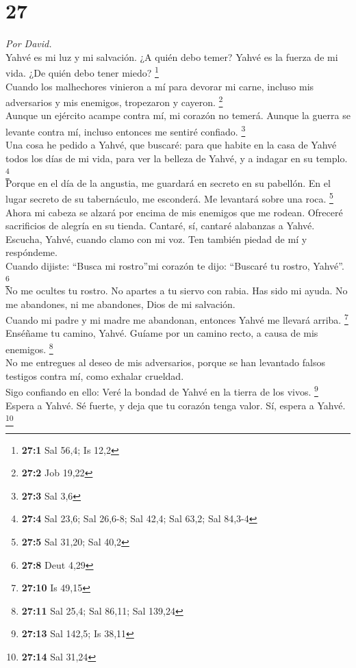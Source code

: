 \hypertarget{section-26}{%
\section{27}\label{section-26}}

\emph{Por David.}\\
 Yahvé es mi luz y mi salvación. ¿A quién debo temer?
Yahvé es la fuerza de mi vida. ¿De quién debo tener miedo? \footnote{\textbf{27:1}
  Sal 56,4; Is 12,2}\\
 Cuando los malhechores vinieron a mí para devorar mi
carne, incluso mis adversarios y mis enemigos, tropezaron y cayeron.
\footnote{\textbf{27:2} Job 19,22}\\
 Aunque un ejército acampe contra mí, mi corazón no
temerá. Aunque la guerra se levante contra mí, incluso entonces me
sentiré confiado. \footnote{\textbf{27:3} Sal 3,6}\\
 Una cosa he pedido a Yahvé, que buscaré: para que habite
en la casa de Yahvé todos los días de mi vida, para ver la belleza de
Yahvé, y a indagar en su templo. \footnote{\textbf{27:4} Sal 23,6; Sal
  26,6-8; Sal 42,4; Sal 63,2; Sal 84,3-4}\\
 Porque en el día de la angustia, me guardará en secreto
en su pabellón. En el lugar secreto de su tabernáculo, me esconderá. Me
levantará sobre una roca. \footnote{\textbf{27:5} Sal 31,20; Sal 40,2}\\
 Ahora mi cabeza se alzará por encima de mis enemigos que
me rodean. Ofreceré sacrificios de alegría en su tienda. Cantaré, sí,
cantaré alabanzas a Yahvé.\\
 Escucha, Yahvé, cuando clamo con mi voz. Ten también
piedad de mí y respóndeme.\\
 Cuando dijiste: ``Busca mi rostro''mi corazón te dijo:
``Buscaré tu rostro, Yahvé''. \footnote{\textbf{27:8} Deut 4,29}\\
 No me ocultes tu rostro. No apartes a tu siervo con
rabia. Has sido mi ayuda. No me abandones, ni me abandones, Dios de mi
salvación.\\
 Cuando mi padre y mi madre me abandonan, entonces Yahvé
me llevará arriba. \footnote{\textbf{27:10} Is 49,15}\\
 Enséñame tu camino, Yahvé. Guíame por un camino recto, a
causa de mis enemigos. \footnote{\textbf{27:11} Sal 25,4; Sal 86,11; Sal
  139,24}\\
 No me entregues al deseo de mis adversarios, porque se
han levantado falsos testigos contra mí, como exhalar crueldad.\\
 Sigo confiando en ello: Veré la bondad de Yahvé en la
tierra de los vivos. \footnote{\textbf{27:13} Sal 142,5; Is 38,11}\\
 Espera a Yahvé. Sé fuerte, y deja que tu corazón tenga
valor. Sí, espera a Yahvé. \footnote{\textbf{27:14} Sal 31,24}

